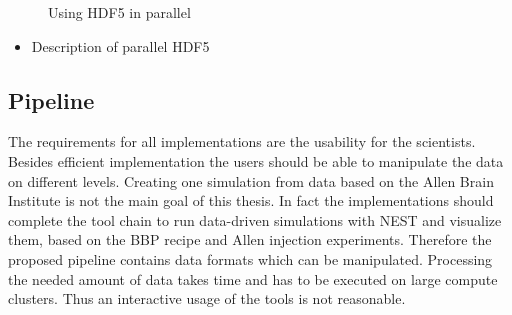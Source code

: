 \documentclass[a4paper]{article}
\begin{document}
\begin{figure}[ht!]
   	\begin{center}
        \hspace{0.5cm}
  
    	   \end{center}
    	\caption{%
        Using HDF5 in parallel 
     }%
   \label{fig:atlas}
   \end{figure}
\begin{itemize}
      \item Description of parallel HDF5
\end{itemize}


\subsection{Pipeline}
The requirements for all implementations are the usability for the scientists. Besides efficient implementation the users should be able to manipulate the data on different levels. Creating one simulation from data based on the Allen Brain Institute is not the main goal of this thesis. In fact the implementations should complete the tool chain to run data-driven simulations with NEST and visualize them, based on the BBP recipe and  Allen injection experiments. Therefore the proposed pipeline contains data formats which can be manipulated. Processing the needed amount of data takes time and has to be executed on large compute clusters. Thus an interactive usage of the tools is not reasonable.
\end{document}
